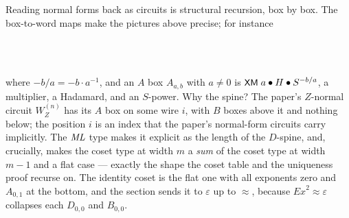 \medskip\noindent
Reading normal forms back as circuits is structural recursion, box by
box.  The box-to-word maps make the pictures above
precise; for instance
\begin{code}%
\>[0]\AgdaSpace{}%
\AgdaSymbol{:}\AgdaSpace{}%
\AgdaSpace{}%
\AgdaSymbol{\{}\AgdaSymbol{\}}\AgdaSpace{}%
\AgdaSpace{}%
\AgdaSpace{}%
\AgdaSpace{}%
\AgdaSpace{}%
\AgdaSymbol{(}\AgdaSpace{}%
\AgdaSymbol{(}\AgdaSpace{}%
\AgdaSymbol{))}\<%
\\
\>[0]\AgdaSpace{}%
\AgdaSymbol{\{}\AgdaSymbol{\}}\AgdaSpace{}%
\AgdaSymbol{(}\AgdaSpace{}%
\AgdaOperator{\AgdaInductiveConstructor{,}}\AgdaSpace{}%
\AgdaSymbol{)}\AgdaSpace{}%
\AgdaSymbol{=}\AgdaSpace{}%
\AgdaSpace{}%
\AgdaSpace{}%
\AgdaSpace{}%
\AgdaSymbol{(}\AgdaOperator{\AgdaPostulate{-}}\AgdaSpace{}%
\AgdaSymbol{)}\<%
\\
\>[0]\AgdaSpace{}%
\AgdaSymbol{\{}\AgdaSymbol{\}}\AgdaSpace{}%
\AgdaSymbol{(}\AgdaSpace{}%
\AgdaSymbol{\AgdaUnderscore{})}\AgdaSpace{}%
\AgdaOperator{\AgdaInductiveConstructor{,}}\AgdaSpace{}%
\AgdaSymbol{)}\AgdaSpace{}%
\AgdaSymbol{=}\AgdaSpace{}%
\AgdaSpace{}%
\AgdaSpace{}%
\AgdaSpace{}%
\AgdaSymbol{(}\AgdaOperator{\AgdaPostulate{-}}\AgdaSpace{}%
\AgdaSymbol{)}\AgdaSpace{}%
\AgdaSpace{}%
\AgdaSpace{}%
\AgdaSpace{}%
\AgdaSpace{}%
\<%
\end{code}
where $-b/a = -b \cdot a^{-1}$, and an $A$ box $A_{a,b}$ with $a \ne 0$
is $\mbox{\textsf{\small XM}}\;a \bullet H \bullet S^{-b/a}$, a multiplier, a Hadamard,
and an $S$-power.  Why the spine?  The paper's $Z$-normal circuit
$W_Z^{(n)}$ has its $A$ box on some wire $i$, with $B$ boxes above it
and nothing below; the position $i$ is an index that the paper's
normal-form circuits carry implicitly.  The $\mathit{ML}$ type makes it explicit
as the length of the $D$-spine, and, crucially, makes the coset type at
width $m$ a \emph{sum} of the coset type at width $m-1$ and a flat case
--- exactly the shape the coset table and the uniqueness proof recurse
on.  The identity coset is the flat one with all exponents zero and
$A_{0,1}$ at the bottom, and the section sends it to $\varepsilon$ up to
$\approx$, because $\mathit{Ex}^2 \approx \varepsilon$ collapses each
$D_{0,0}$ and $B_{0,0}$.

